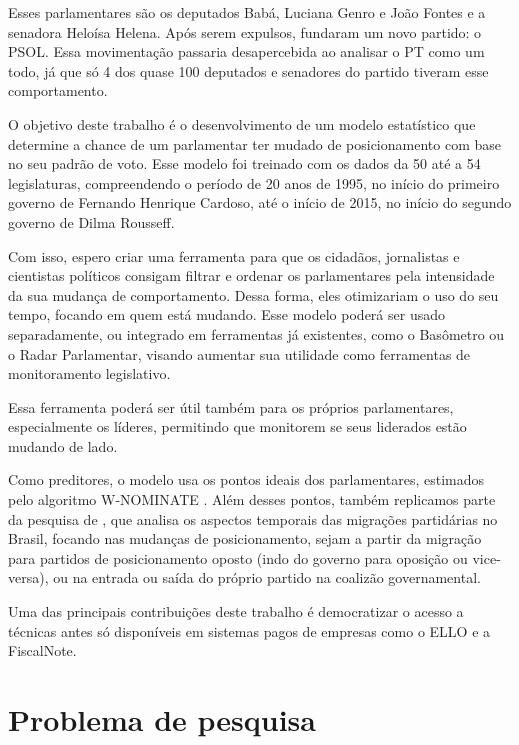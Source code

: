 Esses parlamentares são os deputados Babá, Luciana Genro e João Fontes e a
senadora Heloísa Helena. Após serem expulsos, fundaram um novo partido: o
\gls{PSOL}. Essa movimentação passaria desapercebida ao analisar o \gls{PT}
como um todo, já que só 4 dos quase 100 deputados e senadores do partido
tiveram esse comportamento.

O objetivo deste trabalho é o desenvolvimento de um modelo estatístico que
determine a chance de um parlamentar ter mudado de posicionamento com base no
seu padrão de voto. Esse modelo foi treinado com os dados da
50\textordfeminine{} até a 54\textordfeminine{} legislaturas, compreendendo o
período de 20 anos de 1995, no início do primeiro governo de Fernando Henrique
Cardoso, até o início de 2015, no início do segundo governo de Dilma Rousseff.

Com isso, espero criar uma ferramenta para que os cidadãos, jornalistas e
cientistas políticos consigam filtrar e ordenar os parlamentares pela
intensidade da sua mudança de comportamento. Dessa forma, eles otimizariam o
uso do seu tempo, focando em quem está mudando. Esse modelo poderá ser usado
separadamente, ou integrado em ferramentas já existentes, como o Basômetro ou o
Radar Parlamentar, visando aumentar sua utilidade como ferramentas de
monitoramento legislativo.

Essa ferramenta poderá ser útil também para os próprios parlamentares,
especialmente os líderes, permitindo que monitorem se seus liderados estão
mudando de lado.

Como preditores, o modelo usa os pontos ideais dos parlamentares, estimados
pelo algoritmo W-NOMINATE \cite{Poole1985,Poole2005}. Além desses pontos,
também replicamos parte da pesquisa de , que analisa os
aspectos temporais das migrações partidárias no Brasil, focando nas mudanças de
posicionamento, sejam a partir da migração para partidos de posicionamento
oposto (indo do governo para oposição ou vice-versa), ou na entrada ou saída do
próprio partido na coalizão governamental.

Uma das principais contribuições deste trabalho é democratizar o acesso a
técnicas antes só disponíveis em sistemas pagos de empresas como o \gls{ELLO}
e a FiscalNote.

\section{Problema de pesquisa}
\label{cap:introducao:problemas-de-pesquisa}

